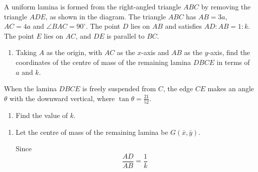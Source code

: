 \documentclass[leqno]{article}
\begin{document}
\begin{enumerate}[
  label=\textbf{\arabic*.},
  leftmargin=*,
  topsep=0pt,
  partopsep=0pt,
  parsep=0pt
]
\begin{figure}[H]
\end{figure}


A uniform lamina is formed from the right-angled triangle $ABC$ by removing the triangle $ADE$, as shown in the diagram. The triangle $ABC$ has $AB=3a$, $AC=4a$ and $\angle BAC=90^\circ$. The point $D$ lies on $AB$ and satisfies $AD:AB=1:k$. The point $E$ lies on $AC$, and $DE$ is parallel to $BC$. \\
\begin{enumerate}[label=\textbf{(\alph*)}]
  \item Taking $A$ as the origin, with $AC$ as the $x$-axis and $AB$ as the $y$-axis, find the coordinates of the centre of mass of the remaining lamina $DBCE$ in terms of $a$ and $k$.  \\
\end{enumerate}
When the lamina $DBCE$ is freely suspended from $C$, the edge $CE$ makes an angle $\theta$ with the downward vertical, where $\tan\theta=\frac{21}{52}$. \\
\begin{enumerate}[label=\textbf{(\alph*)}, resume]
  \item Find the value of $k$.  \\
\end{enumerate}

\vspace*{10pt}

\begin{djsSolution}
\begin{enumerate}[label=\textbf{(\alph*)}, start=1]
  \item Let the centre of mass of the remaining lamina be \(G(\bar x,\bar y)\).

Since
\[
\frac{AD}{AB}=\frac{1}{k}
\]


\end{enumerate}
\end{djsSolution}
\end{enumerate}
\end{document}
